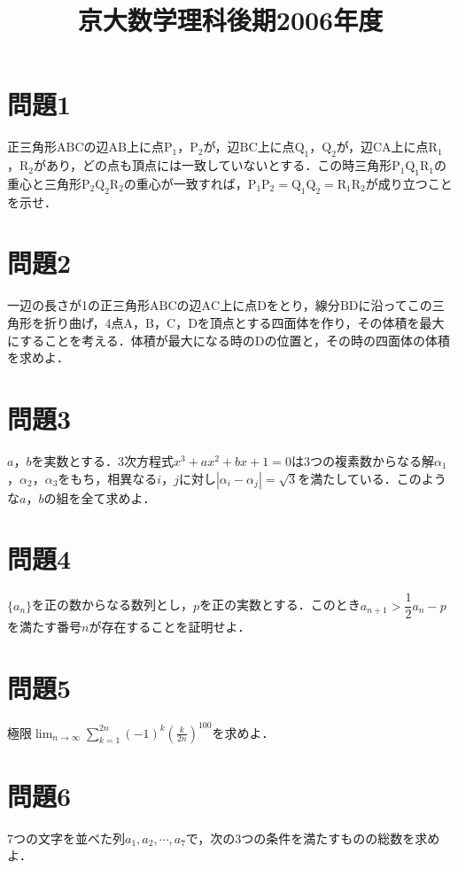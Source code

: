 \documentclass[unicode,12pt, A4j]{ltjsarticle}%
\title{京大数学理科後期2006年度}
\author{}
\date{}
\begin{document}
\maketitle

\section{問題1}
正三角形$\mathrm{ABC}$の辺$\mathrm{AB}$上に点$\mathrm{P}_1$，$\mathrm{P}_2$が，辺$\mathrm{BC}$上に点$\mathrm{Q}_1$，$\mathrm{Q}_2$が，辺$\mathrm{CA}$上に点$\mathrm{R}_1$，$\mathrm{R}_2$があり，どの点も頂点には一致していないとする．この時三角形$\mathrm{P_1Q_1R_1}$の重心と三角形$\mathrm{P_2Q_2R_2}$の重心が一致すれば，$\mathrm{P_1P_2}=\mathrm{Q_1Q_2}=\mathrm{R_1R_2}$が成り立つことを示せ．

\section{問題2}
一辺の長さが1の正三角形$\mathrm{ABC}$の辺$\mathrm{AC}$上に点$\mathrm{D}$をとり，線分$\mathrm{BD}$に沿ってこの三角形を折り曲げ，4点$\mathrm{A}$，$\mathrm{B}$，$\mathrm{C}$，$\mathrm{D}$を頂点とする四面体を作り，その体積を最大にすることを考える．体積が最大になる時の$\mathrm{D}$の位置と，その時の四面体の体積を求めよ．

\section{問題3}
$a$，$b$を実数とする．3次方程式$x^3+ax^2+bx+1=0$は3つの複素数からなる解$\alpha_1$，$\alpha_2$，$\alpha_3$をもち，相異なる$i$，$j$に対し$|\alpha_i-\alpha_j|=\sqrt{3}$を満たしている．このような$a$，$b$の組を全て求めよ．

\section{問題4}
$\{a_n\}$を正の数からなる数列とし，$p$を正の実数とする．このとき$a_{n+1}>\dfrac{1}{2}a_n-p$を満たす番号$n$が存在することを証明せよ．

\section{問題5}
極限${\displaystyle \lim_{n\to\infty}\sum_{k=1}^{2n}(-1)^k\left(\frac{k}{2n}\right)^{100}}$を求めよ．

\section{問題6}
7つの文字を並べた列$a_1,a_2,\cdots,a_7$で，次の3つの条件を満たすものの総数を求めよ．
\end{document}

